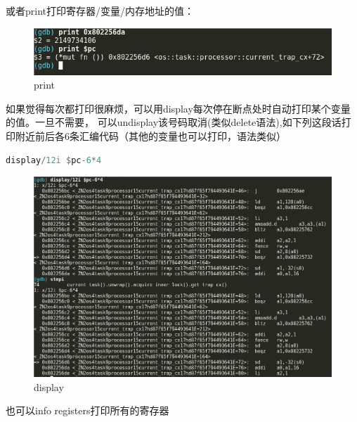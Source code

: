 或者print打印寄存器/变量/内存地址的值：

\begin{figure}[htb]
	\centering
	\includegraphics[width=\textwidth]{figures/02-02-print.png}
	\caption{
		print
	}
	\label{fig:print}
\end{figure}

如果觉得每次都打印很麻烦，可以用display每次停在断点处时自动打印某个变量的值。一旦不需要， 可以undisplay该号码取消(类似delete语法),如下列这段话打印附近前后各6条汇编代码（其他的变量也可以打印，语法类似）

\begin{lstlisting}[language={Rust}, label={code:forktest},
	caption={forktest1.rs}]
	display/12i $pc-6*4
\end{lstlisting}

\begin{figure}[htb]
\centering
\includegraphics[width=\textwidth]{figures/02-02-display.png}
\caption{
	display
}
\label{fig:display}
\end{figure}

也可以info registers打印所有的寄存器

